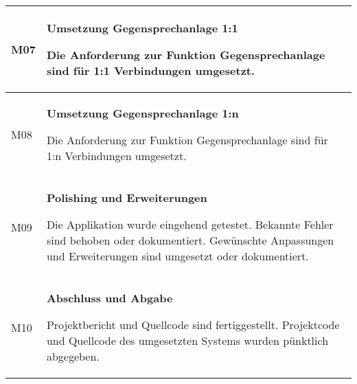 \begin{table}[h]
\begin{tabular}{|l|p{15cm}|}
        M07         & \textbf{Umsetzung Gegensprechanlage 1:1}

        Die Anforderung zur Funktion Gegensprechanlage sind für 1:1 Verbindungen umgesetzt. \\
        \hline

        M08         & \textbf{Umsetzung Gegensprechanlage 1:n}

        Die Anforderung zur Funktion Gegensprechanlage sind für 1:n Verbindungen umgesetzt. \\
        \hline

        M09         & \textbf{Polishing und Erweiterungen}

        Die Applikation wurde eingehend getestet.
        Bekannte Fehler sind behoben oder dokumentiert.
        Gewünschte Anpassungen und Erweiterungen sind umgesetzt oder dokumentiert.
        \\
        \hline

        M10         & \textbf{Abschluss und Abgabe}

        Projektbericht und Quellcode sind fertiggestellt.
        Projektcode und Quellcode des umgesetzten Systems wurden pünktlich abgegeben.\\
        \hline
    \end{tabular}\label{tab:milestones}
\end{table}

\clearpage
